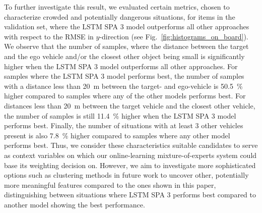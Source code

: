 To further investigate this result, we evaluated certain metrics, chosen to characterize crowded and potentially dangerous situations, for items in the validation set, where the \ac{LSTM} \ac{SPA} \num{3} model outperforms all other approaches with respect to the \ac{RMSE} in $y$-direction (see Fig.~\ref{fig:histograms_on_board}).
We observe that the number of samples, where the distance between the target and the ego vehicle and/or the closest other object being small is significantly higher when the \ac{LSTM} \ac{SPA} \num{3} model outperforms all other approaches.
For samples where the \ac{LSTM} \ac{SPA} \num{3} model performs best, the number of samples with a distance less than \SI{20}{\meter} between the target- and ego-vehicle is \SI{50.5}{\percent} higher compared to samples where any of the other models performs best.
For distances less than \SI{20}{\meter} between the target vehicle and the closest other vehicle, the number of samples is still \SI{11.4}{\percent} higher when the \ac{LSTM} \ac{SPA} \num{3} model performs best.
Finally, the number of situations with at least \num{3} other vehicles present is also \SI{7.8}{\percent} higher compared to samples where any other model performs best.
Thus, we consider these characteristics suitable candidates to serve as context variables on which our online-learning mixture-of-experts system could base its weighting decision on.
However, we aim to investigate more sophisticated options such as clustering methods in future work to uncover other, potentially more meaningful features compared to the ones shown in this paper, distinguishing between situations where \ac{LSTM} \ac{SPA} \num{3} performs best compared to another model showing the best performance.

